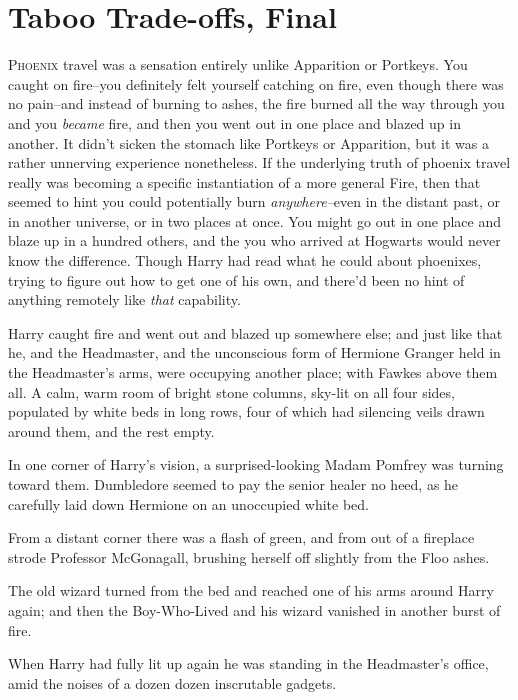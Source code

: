 \chapter{Taboo Trade-offs, Final}

\lettrine{P}{hoenix} travel was a sensation entirely unlike Apparition or Portkeys. You caught on fire\---you definitely felt yourself catching on fire, even though there was no pain\---and instead of burning to ashes, the fire burned all the way through you and you \emph{became} fire, and then you went out in one place and blazed up in another. It didn't sicken the stomach like Portkeys or Apparition, but it was a rather unnerving experience nonetheless. If the underlying truth of phoenix travel really was becoming a specific instantiation of a more general Fire, then that seemed to hint you could potentially burn \emph{anywhere\---}even in the distant past, or in another universe, or in two places at once. You might go out in one place and blaze up in a hundred others, and the you who arrived at Hogwarts would never know the difference. Though Harry had read what he could about phoenixes, trying to figure out how to get one of his own, and there'd been no hint of anything remotely like \emph{that} capability.

Harry caught fire and went out and blazed up somewhere else; and just like that he, and the Headmaster, and the unconscious form of Hermione Granger held in the Headmaster's arms, were occupying another place; with Fawkes above them all. A calm, warm room of bright stone columns, sky-lit on all four sides, populated by white beds in long rows, four of which had silencing veils drawn around them, and the rest empty.

In one corner of Harry's vision, a surprised-looking Madam Pomfrey was turning toward them. Dumbledore seemed to pay the senior healer no heed, as he carefully laid down Hermione on an unoccupied white bed.

From a distant corner there was a flash of green, and from out of a fireplace strode Professor McGonagall, brushing herself off slightly from the Floo ashes.

The old wizard turned from the bed and reached one of his arms around Harry again; and then the Boy-Who-Lived and his wizard vanished in another burst of fire.

\later

When Harry had fully lit up again he was standing in the Headmaster's office, amid the noises of a dozen dozen inscrutable gadgets.

